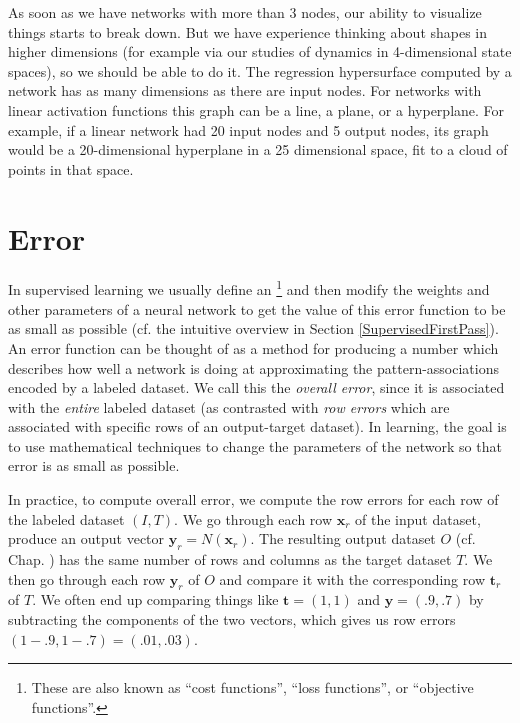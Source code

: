 As soon as we have networks with more than 3 nodes, our ability to visualize things starts to break down. But we have experience thinking about shapes in higher dimensions (for example via our studies of dynamics in 4-dimensional state spaces), so we should be able to do it. The regression hypersurface computed by a network has as many dimensions as there are input nodes. For networks with linear activation functions this graph can be a line, a plane, or a hyperplane. For example, if a linear network had 20 input nodes and 5 output nodes, its graph would be a 20-dimensional hyperplane in a 25 dimensional space, fit to a cloud of  points in that space.


\section{Error}\label{sect_error}

In supervised learning we usually define an \footnote{These are also known as ``cost functions'', ``loss functions'', or ``objective functions''.} and then modify the weights and other parameters of a neural network to get the value of this error function to be as small as possible (cf. the intuitive overview in Section \ref{SupervisedFirstPass}). An error function can be thought of as a method for producing a number which describes how well a network is doing at approximating the pattern-associations encoded by a labeled dataset. We call this the \emph{overall error}, since it is associated with the \emph{entire} labeled dataset (as contrasted with \emph{row errors} which are associated with specific rows of an output-target dataset). In learning, the goal is to use mathematical techniques to change the parameters of the network so that error is as small as possible.

In practice, to compute overall error, we compute the row errors for each row of the labeled dataset $(I,T)$. We go through each row $\mathbf{x}_r$  of the input dataset, produce an output vector $\mathbf{y}_r = N(\mathbf{x}_r)$. The resulting output dataset $O$ (cf. Chap. ) has the same number of rows and columns as the target dataset $T$. We then go through each row $\mathbf{y}_r$ of $O$ and compare it with the corresponding row $\mathbf{t}_r$ of $T$. We often end up comparing things like $\mathbf{t}  =  (1,1)$ and $\mathbf{y}  =  (.9,.7)$ by subtracting the components of the two vectors, which gives us row errors $(1-.9,1-.7) = (.01,.03)$. 

